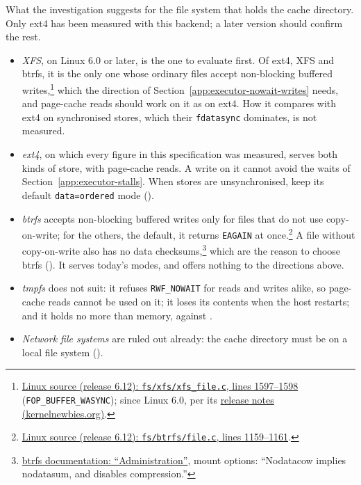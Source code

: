 What the investigation suggests for the file system that holds the cache
directory. Only ext4 has been measured with this backend; a later version
should confirm the rest.
\begin{itemize}
  \item \emph{XFS}, on Linux 6.0 or later, is the one to evaluate first. Of
    ext4, XFS and btrfs, it is the only one whose ordinary files accept
    non-blocking buffered
    writes,\footnote{\href{https://github.com/torvalds/linux/blob/v6.12/fs/xfs/xfs_file.c\#L1597-L1598}{Linux
    source (release 6.12): \texttt{fs/xfs/xfs\_file.c}, lines 1597--1598}
    (\texttt{FOP\_BUFFER\_WASYNC}); since Linux 6.0, per its
    \href{https://kernelnewbies.org/Linux_6.0}{release notes
    (kernelnewbies.org)}.} which the direction of
    Section~\ref{app:executor-nowait-writes} needs, and page-cache reads
    should work on it as on ext4. How it compares with ext4 on synchronised
    stores, which their \texttt{fdatasync} dominates, is not measured.
  \item \emph{ext4}, on which every figure in this specification was
    measured, serves both kinds of store, with page-cache reads. A write on
    it cannot avoid the waits of Section~\ref{app:executor-stalls}. When
    stores are unsynchronised, keep its default \texttt{data=ordered} mode
    ().
  \item \emph{btrfs} accepts non-blocking buffered writes only for files
    that do not use copy-on-write; for the others, the default, it returns
    \texttt{EAGAIN} at
    once.\footnote{\href{https://github.com/torvalds/linux/blob/v6.12/fs/btrfs/file.c\#L1159-L1161}{Linux
    source (release 6.12): \texttt{fs/btrfs/file.c}, lines 1159--1161}.} A file
    without copy-on-write also has no data
    checksums,\footnote{\href{https://btrfs.readthedocs.io/en/latest/Administration.html}{btrfs
    documentation: ``Administration''}, mount options: ``Nodatacow implies
    nodatasum, and disables compression.''} which are the reason to choose
    btrfs (). It serves today's modes,
    and offers nothing to the directions above.
  \item \emph{tmpfs} does not suit: it refuses \texttt{RWF\_NOWAIT} for
    reads and writes alike, so page-cache reads cannot be used on it; it
    loses its contents when the host restarts; and it holds no more than
    memory, against .
  \item \emph{Network file systems} are ruled out already: the cache
    directory must be on a local file system
    ().
\end{itemize}

